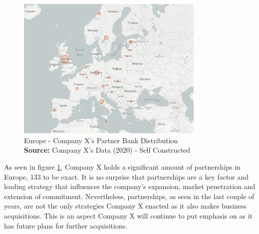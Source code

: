 \documentclass[11pt,a4paper]{article}
\newcommand*{\captionsource}[2]{%
  \caption[{#1}]{%
    #1%
    \\\hspace{\linewidth}%
    \textbf{Source:} #2%
  }%
}
\begin{document}
{{  \vspace{5mm}
\begin{figure}[H]
	\centering
  \includegraphics[width=90mm]{figures/fig_partner_dist}
  \vspace{5mm}
    \captionsetup{justification=centering,margin=2cm}
      \captionsource{Europe - Company X's Partner Bank Distribution}{Company X's Data (2020) - Self Constructed}
	\label{fig:raisin_partnerbank_dist}
\end{figure}

As seen in figure \ref{fig:raisin_partnerbank_dist}, Company X holds a significant amount of partnerships in Europe, 133 to be exact. It is no surprise that partnerships are a key factor and leading strategy that influences the company's expansion, market penetration and extension of commitment. Nevertheless, partnerships, as seen in the last couple of years, are not the only strategies Company X enacted as it also makes business acquisitions. This is an aspect Company X will continue to put emphasis on as it has future plans for further acquisitions. 

\vspace{-1mm}

}}
\end{document}

